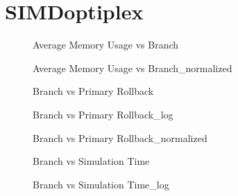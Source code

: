 \section{SIMDoptiplex}
\begin{figure}[H]
\centering

\caption{Average Memory Usage vs Branch}
\end{figure}
\vspace{1cm}
\begin{figure}[H]
\centering

\caption{Average Memory Usage vs Branch\_normalized}
\end{figure}
\vspace{1cm}
\newpage
\begin{figure}[H]
\centering

\caption{Branch vs Primary Rollback}
\end{figure}
\vspace{1cm}
\begin{figure}[H]
\centering

\caption{Branch vs Primary Rollback\_log}
\end{figure}
\vspace{1cm}
\newpage
\begin{figure}[H]
\centering

\caption{Branch vs Primary Rollback\_normalized}
\end{figure}
\vspace{1cm}
\begin{figure}[H]
\centering

\caption{Branch vs Simulation Time}
\end{figure}
\vspace{1cm}
\newpage
\begin{figure}[H]
\centering

\caption{Branch vs Simulation Time\_log}
\end{figure}
